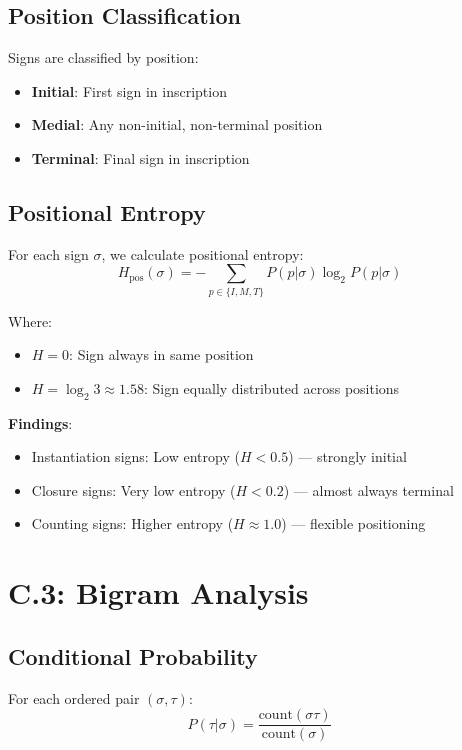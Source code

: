 \subsection*{Position Classification}

Signs are classified by position:
\begin{itemize}
    \item \textbf{Initial}: First sign in inscription
    \item \textbf{Medial}: Any non-initial, non-terminal position
    \item \textbf{Terminal}: Final sign in inscription
\end{itemize}

\subsection*{Positional Entropy}

For each sign $\sigma$, we calculate positional entropy:
\[
H_{\text{pos}}(\sigma) = -\sum_{p \in \{I,M,T\}} P(p|\sigma) \log_2 P(p|\sigma)
\]

Where:
\begin{itemize}
    \item $H = 0$: Sign always in same position
    \item $H = \log_2 3 \approx 1.58$: Sign equally distributed across positions
\end{itemize}

\textbf{Findings}:
\begin{itemize}
    \item Instantiation signs: Low entropy ($H < 0.5$) — strongly initial
    \item Closure signs: Very low entropy ($H < 0.2$) — almost always terminal
    \item Counting signs: Higher entropy ($H \approx 1.0$) — flexible positioning
\end{itemize}

\section*{C.3: Bigram Analysis}

\subsection*{Conditional Probability}

For each ordered pair $(\sigma, \tau)$:
\[
P(\tau | \sigma) = \frac{\text{count}(\sigma\tau)}{\text{count}(\sigma)}
\]

